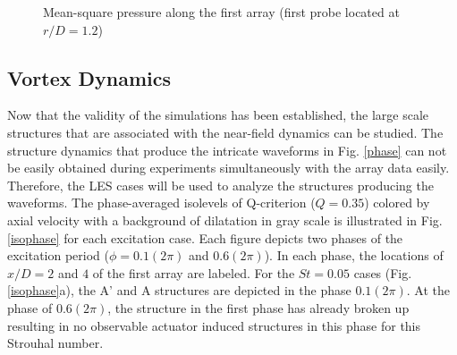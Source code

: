 \documentclass[english]{aiaa-tc}
\begin{document}
\begin{figure}
\centering{}
\caption{Mean-square pressure along the first array (first probe located at $r/D=1.2$)}\label{pms}
\end{figure}

\subsection{Vortex Dynamics}
Now that the validity of the simulations has been established, the large scale structures that are associated with the near-field dynamics can be studied. The structure dynamics that produce the intricate waveforms in Fig. \ref{phase} can not be easily obtained during experiments simultaneously with the array data easily. Therefore, the LES cases will be used to analyze the structures producing the waveforms. The phase-averaged isolevels of Q-criterion ($Q=0.35$) colored by axial velocity with a background of dilatation in gray scale is illustrated in Fig. \ref{isophase} for each excitation case. Each figure depicts two phases of the excitation period ($\phi =0.1(2\pi)$ and $0.6(2\pi)$). In each phase, the locations of $x/D=2$ and $4$ of the first array are labeled. 
For the $St=0.05$ cases (Fig. \ref{isophase}a), the A' and A structures are depicted in the phase $0.1(2\pi)$. At the phase of $0.6(2\pi)$, the structure in the first phase has already broken up resulting in no observable actuator induced structures in this phase for this Strouhal number. 
\end{document}
